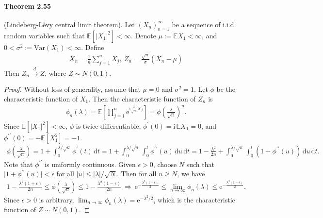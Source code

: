 \documentclass{article}
\numberwithin{equation}{section}
\newcommand{\e}{\mathrm{e}}
\newcommand{\E}{\mathbb{E}}
\renewcommand{\d}{\mathrm{d}}
\renewcommand{\i}{\mathrm{i}}
\theoremstyle{plain}
\theoremstyle{definition}
\begin{document}
\paragraph{Theorem 2.55\label{thm:2.55}} (Lindeberg-Lévy central limit theorem). Let $(X_n)_{n=1}^\infty$ be a sequence of i.i.d. random variables such that $\E\left[\vert X_1\vert^2\right]<\infty$. Denote $\mu:=\E X_1<\infty$, and $0<\sigma^2:=\mathrm{Var}(X_1)<\infty$. Define
\begin{align*}
	\overline{X}_n = \frac{1}{n}\sum_{j=1}^n X_j,\ Z_n=\frac{\sqrt{n}}{\sigma}(\overline{X}_n-\mu)
\end{align*}
Then $Z_n\overset{d}{\to}Z$, where $Z\sim N(0,1)$.
\begin{proof}
Without loss of generality, assume that $\mu=0$ and $\sigma^2=1$. Let $\phi$ be the characteristic function of $X_1$. Then the characteristic function of $Z_n$ is
\begin{align*}
	\phi_n(\lambda)=\E\left[\prod_{j=1}^n\e^{\i\frac{\lambda}{\sqrt{n}}X_j}\right] = \phi\left(\frac{\lambda}{\sqrt{n}}\right)^n.
\end{align*}
Since $\E[\vert X_1\vert^2]<\infty$, $\phi$ is twice-differentiable, $\phi^\prime(0)=\i\,\E X_1=0$, and $\phi^{\prime\prime}(0)=-\E[X_1^2]=-1$. 
\begin{align*}
	\phi\left(\frac{\lambda}{\sqrt{n}}\right) = 1 + \int_0^{\lambda/\sqrt{n}}\phi^\prime(t)\,\d t = 1 + \int_0^{\lambda/\sqrt{n}}\int_0^t\phi^{\prime\prime}(u)\,\d u\,\d t = 1 - \frac{\lambda^2}{2n} + \int_0^{\lambda/\sqrt{n}}\int_0^t\left(1+\phi^{\prime\prime}(u)\right)\,\d u\,\d t.
\end{align*}
Note that $\phi^{\prime\prime}$ is uniformly continuous. Given $\epsilon>0$, choose $N$ such that $\vert 1+\phi^{\prime\prime}(u)\vert<\epsilon$ for all $\vert u\vert\leq\vert\lambda\vert/\sqrt{N}$. Then for all $n\geq N$, we have
\begin{align*}
	1-\frac{\lambda^2(1+\epsilon)}{2n} \leq \phi\left(\frac{\lambda}{\sqrt{n}}\right) \leq 1-\frac{\lambda^2(1-\epsilon)}{2n}\ \Rightarrow\ \e^{-\frac{\lambda^2(1+\epsilon)}{2}}\leq\lim_{n\to\infty}\phi_n(\lambda)\leq\e^{-\frac{\lambda^2(1-\epsilon)}{2}}.
\end{align*}
Since $\epsilon>0$ is arbitrary, $\lim_{n\to\infty}\phi_n(\lambda)=\e^{-\lambda^2/2}$, which is the characteristic function of $Z\sim N(0,1)$.
\end{proof}
\end{document}
